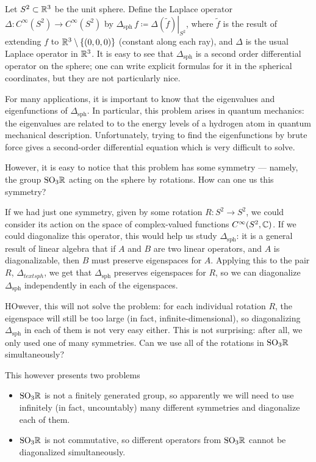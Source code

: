 Let $S^2\subset\mathbb{R}^3$ be the unit sphere. Define the Laplace operator
$\Delta\colon C^\infty(S^2)\to C^\infty(S^2)$ by
$\Delta_{\text{sph}}\,f\coloneq\left.\Delta(\tilde f)\right|_{S^2}$, where
$\tilde f$ is the result of extending $f$ to $\mathbb{R}^3\setminus\{(0,0,0)\}$
(constant along each ray), and $\Delta$ is the usual Laplace operator in
$\mathbb{R}^3$. It is easy to see that $\Delta_{\text{sph}}$ is a second order
differential operator on the sphere; one can write explicit formulas for it
in the spherical coordinates, but they are not particularly nice.

For many applications, it is important to know that the eigenvalues and
eigenfunctions of $\Delta_{\text{sph}}$. In particular, this problem arises
in quantum mechanics: the eigenvalues are related to to the energy levels
of a hydrogen atom in quantum mechanical description. Unfortunately, trying
to find the eigenfunctions by brute force gives a second-order differential
equation which is very difficult to solve.

However, it is easy to notice that this problem has some symmetry ---
namely, the group $\mathrm{SO}_3\mathbb{R}$ acting on the sphere by rotations. How can
one us this symmetry?

If we had just one symmetry, given by some rotation $R\colon S^2\to S^2$,
we could consider its action on the space of complex-valued functions
$C^\infty(S^2,\mathbb{C})$. If we could diagonalize this operator, this would
help us study $\Delta_{\text{sph}}$: it is a general result of linear
algebra that if $A$ and $B$ are two linear operators, and $A$ is
diagonalizable, then $B$ must preserve eigenspaces for $A$. Applying this
to the pair $R$, $\Delta_{text{sph}}$, we get that $\Delta_{\text{sph}}$
preserves eigenspaces for $R$, so we can diagonalize $\Delta_{\text{sph}}$
independently in each of the eigenspaces.

HOwever, this will not solve the problem: for each individual rotation $R$,
the eigenspace will still be too large (in fact, infinite-dimensional), so
diagonalizing $\Delta_{\text{sph}}$ in each of them is not very easy
either. This is not surprising: after all, we only used one of many
symmetries. Can we use all of the rotations in $\mathrm{SO}_3\mathbb{R}$ simultaneously?

This however presents two problems
\begin{itemize}
\item $\mathrm{SO}_3\mathbb{R}$ is not a finitely generated group, so apparently we will
  need to use infinitely (in fact, uncountably) many different symmetries
  and diagonalize each of them.
\item $\mathrm{SO}_3\mathbb{R}$ is not commutative, so different operators from
  $\mathrm{SO}_3\mathbb{R}$ cannot be diagonalized simultaneously.
\end{itemize}

